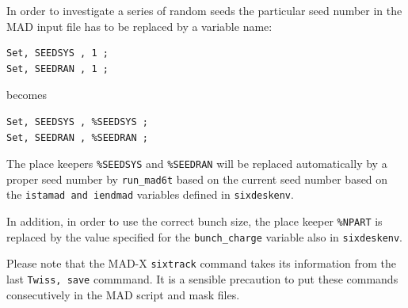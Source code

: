 \documentclass{cernatsnote}    %
\begin{document}
In order to investigate a
series of random seeds the particular seed number in the MAD input
file has to be replaced by a variable name:
\begin{verbatim}
Set, SEEDSYS , 1 ;
Set, SEEDRAN , 1 ;
\end{verbatim}
becomes
\begin{verbatim}
Set, SEEDSYS , %SEEDSYS ;
Set, SEEDRAN , %SEEDRAN ;
\end{verbatim}
The place keepers {\tt \%SEEDSYS} and {\tt \%SEEDRAN} will be replaced
automatically by a proper seed number by {\tt run\_mad6t} based on the
current seed number based on the {\tt istamad and iendmad} variables
defined in {\tt sixdeskenv}. 

In addition, in order to use the correct bunch size, the place keeper 
{\tt \%NPART} is replaced by the value specified for the {\tt bunch\_charge}
 variable also in {\tt sixdeskenv}.

Please note that the MAD-X {\tt sixtrack} command takes its
information from the last {\tt Twiss, save} commmand. It is a
sensible precaution to put these commands consecutively in the MAD
script and mask files.
\end{document}
